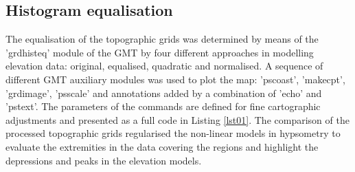 \documentclass[minerals,article,submit,pdftex,moreauthors]{Definitions/mdpi}
\begin{document}
\subsection{Histogram equalisation}

The equalisation of the topographic grids was determined by means of the 'grdhisteq' module of the GMT by four different approaches in modelling elevation data: original, equalised, quadratic and normalised. A sequence of different GMT auxiliary modules was used to plot the map: 'pscoast', 'makecpt', 'grdimage', 'psscale' and annotations added by a combination of 'echo' and 'pstext'. The parameters of the commands are defined for fine cartographic adjustments and presented as a full code in Listing \ref{lst01}. The comparison of the processed topographic grids regularised the non-linear models in hypsometry to evaluate the extremities in the data covering the regions and highlight the depressions and peaks in the elevation models.
\end{document}
